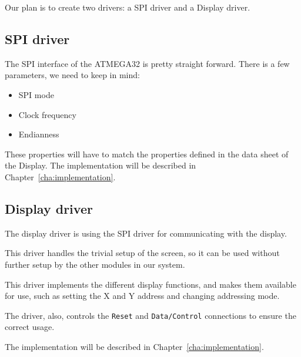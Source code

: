 Our plan is to create two drivers: a SPI driver and a Display driver.

\subsection{SPI driver}

The SPI interface of the ATMEGA32 is pretty straight forward. There is a few parameters, we need to keep in mind:

\begin{itemize}
\item SPI mode
\item Clock frequency
\item Endianness
\end{itemize}

These properties will have to match the properties defined in the data sheet of the Display. The implementation will be described in Chapter~\ref{cha:implementation}.

\subsection{Display driver}

The display driver is using the SPI driver for communicating with the display. 

This driver handles the trivial setup of the screen, so it can be used without further setup by the other modules in our system.

This driver implements the different display functions, and makes them available for use, such as setting the X and Y address and changing addressing mode. 

The driver, also, controls the \texttt{Reset} and \texttt{Data/Control} connections to ensure the correct usage.

The implementation will be described in Chapter~\ref{cha:implementation}.